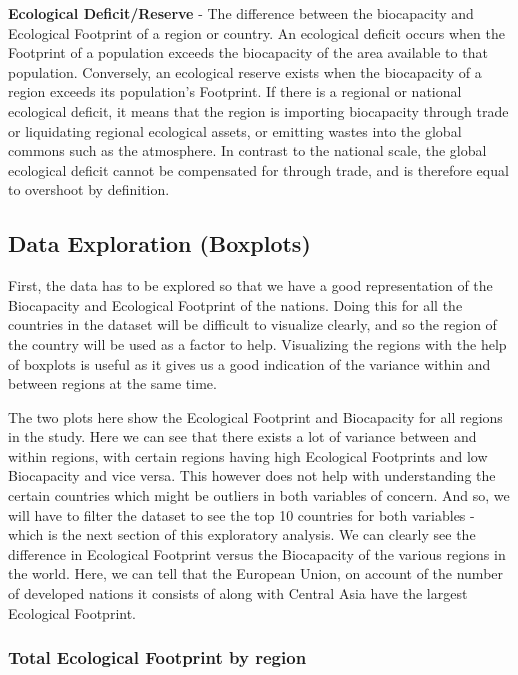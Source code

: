 \documentclass[
]{article}
\begin{document}
\textbf{Ecological Deficit/Reserve} - The difference between the
biocapacity and Ecological Footprint of a region or country. An
ecological deficit occurs when the Footprint of a population exceeds the
biocapacity of the area available to that population. Conversely, an
ecological reserve exists when the biocapacity of a region exceeds its
population's Footprint. If there is a regional or national ecological
deficit, it means that the region is importing biocapacity through trade
or liquidating regional ecological assets, or emitting wastes into the
global commons such as the atmosphere. In contrast to the national
scale, the global ecological deficit cannot be compensated for through
trade, and is therefore equal to overshoot by definition.

\hypertarget{data-exploration-boxplots}{%
\subsection{Data Exploration
(Boxplots)}\label{data-exploration-boxplots}}

First, the data has to be explored so that we have a good representation
of the Biocapacity and Ecological Footprint of the nations. Doing this
for all the countries in the dataset will be difficult to visualize
clearly, and so the region of the country will be used as a factor to
help. Visualizing the regions with the help of boxplots is useful as it
gives us a good indication of the variance within and between regions at
the same time.

The two plots here show the Ecological Footprint and Biocapacity for all
regions in the study. Here we can see that there exists a lot of
variance between and within regions, with certain regions having high
Ecological Footprints and low Biocapacity and vice versa. This however
does not help with understanding the certain countries which might be
outliers in both variables of concern. And so, we will have to filter
the dataset to see the top 10 countries for both variables - which is
the next section of this exploratory analysis. We can clearly see the
difference in Ecological Footprint versus the Biocapacity of the various
regions in the world. Here, we can tell that the European Union, on
account of the number of developed nations it consists of along with
Central Asia have the largest Ecological Footprint.

\hypertarget{total-ecological-footprint-by-region}{%
\subsubsection{Total Ecological Footprint by
region}\label{total-ecological-footprint-by-region}}
\end{document}

